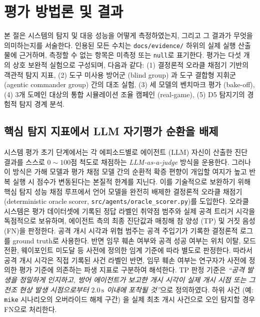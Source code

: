 \section{평가 방법론 및 결과}
\label{sec:evaluation_methodology}

본 절은 시스템의 탐지 및 대응 성능을 어떻게 측정하였는지, 그리고 그 결과가 무엇을 의미하는지를 서술한다. 인용된 모든 수치는 \texttt{docs/evidence/} 하위의 실제 실행 산출물에 근거하며, 측정할 수 없는 항목은 미측정 또는 \texttt{null}로 표기한다. 평가는 다섯 개의 상호 보완적 실험으로 구성되며, 다음과 같다: (1) 결정론적 오라클 채점기 기반의 객관적 탐지 지표, (2) 도구 미사용 방어군 (blind group) 과 도구 결합형 지휘군 (agentic commander group) 간의 대조 실험, (3) 세 모델의 벤치마크 평가 (bake-off), (4) 3개 도메인 대상의 통합 시뮬레이션 조율 캠페인 (real-game), (5) D5 탐지기의 경험적 탐지 경계 분석.

\subsection{핵심 탐지 지표에서 LLM 자기평가 순환을 배제}
\label{subsec:eval_methodology}

시스템 평가 초기 단계에서는 각 에피소드별로 에이전트 (LLM) 자신이 산출한 진단 결과를 스스로 $0\sim100$점 척도로 채점하는 \textit{LLM-as-a-judge} 방식을 운용한다. 그러나 이 방식은 가해 모델과 평가 채점 모델 간의 순환적 확증 편향이 개입할 여지가 높고 반복 실행 시 점수가 변동된다는 본질적 한계를 지닌다. 
%
이를 기술적으로 보완하기 위해 핵심 탐지 성능 채점 루프에서 언어 모델을 완전히 배제한 결정론적 오라클 채점기 (deterministic oracle scorer, \texttt{src/agents/oracle\_scorer.py})를 도입한다. 오라클 시스템은 평가 데이터셋에 기록된 정답 라벨인 취약점 범주와 실제 공격 트리거 시각을 독점적으로 보유하며, 에이전트 측의 최종 진단값과 매칭해 참 양성 (TP) 및 거짓 음성 (FN)을 판정한다. 
%
공격 개시 시각과 위협 범주는 공격 주입기가 기록한 결정론적 로그를
ground truth로 사용한다. 반면 임무 훼손 여부와 공격 성공 여부는 위치 이탈, 모드 전환,
웨이포인트 미도달 등 사전에 정의한 임계 기준에 따라 별도로 판정한다.
따라서 공격 개시 시각은 직접 기록된 사건 라벨인 반면, 임무 훼손 여부는 연구자가 사전에 정의한
평가 기준에 의존하는 파생 지표로 구분하여 해석한다.
TP 판정 기준은 \emph{``공격 발생을 정밀하게 인지하고, 방어 에이전트가 보고한 개시 시각이 실제 개시 시점 또는 그 전조 현상 발생 시점으로부터 $2.0\,\text{s}$ 이내에 포착될 것''}으로 정의하였다. 하위 사건 (예: \texttt{mike} 시나리오의 오버라이드 해제 구간) 을 실제 최초 개시 사건으로 오인 탐지할 경우 FN으로 처리한다.

